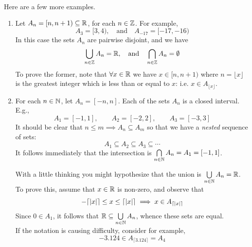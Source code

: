 Here are a few more examples.

 
\begin{examples}{}{}
	\begin{enumerate}
	\item\label{ex:index2} Let $A_n=[n,n+1)\subseteq\mathbb{R}$, for each $n\in\mathbb{Z}$. For example,
	\[
		A_3=[3,4),\quad\text{and}\quad A_{-17}=[-17,-16)
	\]
In this case the sets $A_n$ are pairwise disjoint, and we have
	\[
		\bigcup\limits_{n\in\mathbb{Z}}A_n=\mathbb{R},\quad\text{and}\quad\bigcap\limits_{n\in\mathbb{Z}}A_n=\emptyset
	\]
To prove the former, note that $\forall x\in\mathbb{R}$ we have $x\in[n,n+1)$ where $n=\lfloor x\rfloor$ is the greatest integer which is less than or equal to $x$: i.e. $x\in A_{\lfloor x\rfloor}$.


	\item\vspace*{5pt} For each $n\in\mathbb{N}$, let $A_n=[-n,n]$. Each of the sets $A_n$ is a closed interval. E.g.,
	\[
		A_1=[-1,1],\qquad A_2=[-2,2],\qquad A_3=[-3,3]
	\]
	It should be clear that $n\le m\implies A_n\subseteq A_m$ so that we have a \emph{nested} sequence of sets:
	\[
		A_1\subseteq A_2\subseteq A_3\subseteq\cdots
	\]
	It follows immediately that the intersection is $\bigcap\limits_{n\in\mathbb{N}}A_n=A_1=[-1,1]$.\par
	With a little thinking you might hypothesize that the union is $\bigcup\limits_{n\in\mathbb{N}}A_n=\mathbb{R}$. To prove this, assume that $x\in\mathbb{R}$ is non-zero, and observe that
	\[
		-\lceil\left| x\right|\rceil\le x\le\lceil\left| x\right|\rceil\implies x\in A_{\lceil\left| x\right|\rceil}
	\]
	Since $0\in A_1$, it follows that $\mathbb{R}\subseteq\bigcup\limits_{n\in\mathbb{N}}A_n$, whence these sets are equal.\\
	If the notation is causing difficulty, consider for example,
	\[
		-3.124\in A_{\lceil 3.124\rceil}=A_4
	\]
	

\end{enumerate}
\end{examples}
